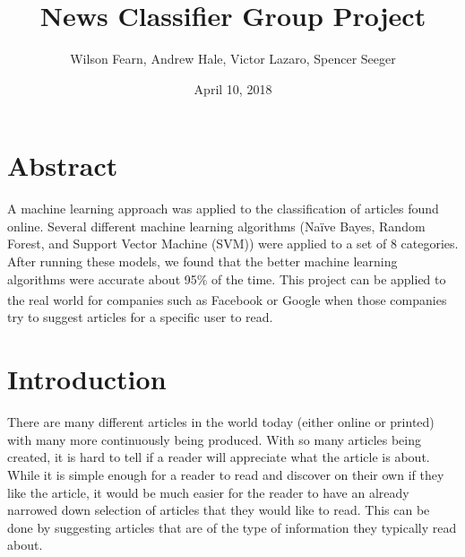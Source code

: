 \documentclass{article}
\begin{document}
    \title{News Classifier Group Project}
    \author{Wilson Fearn, Andrew Hale, Victor Lazaro, Spencer Seeger}
    \date{April 10, 2018}
    \maketitle
    \section{Abstract}
    A machine learning approach was applied to the classification of articles found online. 
    Several different machine learning algorithms (Na\"ive Bayes, Random Forest, and 
    Support Vector Machine (SVM)) were applied to a set of 8 categories. 
    After running these models, we found that the better machine learning algorithms were 
    accurate about 95\% of the time. This project can be applied to the real world for 
    companies such as Facebook\textsuperscript{\textregistered} or 
    Google\textsuperscript{\textregistered} when those companies try to suggest articles 
    for a specific user to read.

    \section{Introduction}
    There are many different articles in the world today (either online or printed) with many more 
    continuously being produced. With so many articles being created, it is hard to tell if a reader 
    will appreciate what the article is about. While it is simple enough for a reader to read and 
    discover on their own if they like the article, it would be much easier for the reader to have an 
    already narrowed down selection of articles that they would like to read. This can be done by 
    suggesting articles that are of the type of information they typically read about.\\
    
\end{document}
